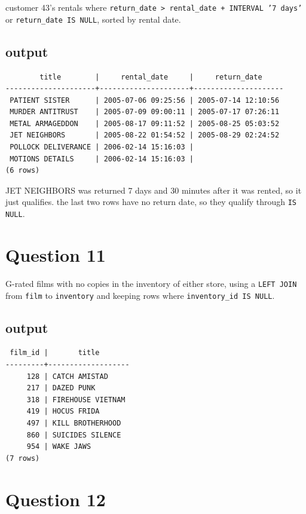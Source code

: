 \documentclass[11pt]{article}
\begin{document}
customer 43's rentals where \texttt{return\_date > rental\_date + INTERVAL '7 days'} or
\texttt{return\_date IS NULL}, sorted by rental date.

\subsection*{output}
{\small
\begin{verbatim}
        title        |     rental_date     |     return_date
---------------------+---------------------+---------------------
 PATIENT SISTER      | 2005-07-06 09:25:56 | 2005-07-14 12:10:56
 MURDER ANTITRUST    | 2005-07-09 09:00:11 | 2005-07-17 07:26:11
 METAL ARMAGEDDON    | 2005-08-17 09:11:52 | 2005-08-25 05:03:52
 JET NEIGHBORS       | 2005-08-22 01:54:52 | 2005-08-29 02:24:52
 POLLOCK DELIVERANCE | 2006-02-14 15:16:03 |
 MOTIONS DETAILS     | 2006-02-14 15:16:03 |
(6 rows)
\end{verbatim}
}

JET NEIGHBORS was returned 7 days and 30 minutes after it was rented, so it just qualifies.
the last two rows have no return date, so they qualify through \texttt{IS NULL}.

\section*{Question 11}

G-rated films with no copies in the inventory of either store, using a \texttt{LEFT JOIN} from
\texttt{film} to \texttt{inventory} and keeping rows where \texttt{inventory\_id IS NULL}.

\subsection*{output}
{\small
\begin{verbatim}
 film_id |       title
---------+-------------------
     128 | CATCH AMISTAD
     217 | DAZED PUNK
     318 | FIREHOUSE VIETNAM
     419 | HOCUS FRIDA
     497 | KILL BROTHERHOOD
     860 | SUICIDES SILENCE
     954 | WAKE JAWS
(7 rows)
\end{verbatim}
}

\section*{Question 12}
\end{document}
